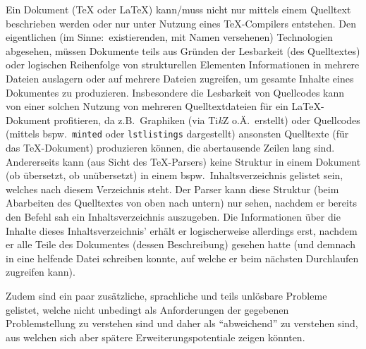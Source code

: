 \label{subsec:logicOutsideDocuments}%
Ein Dokument (\TeX{} oder \LaTeX{}) kann/muss nicht nur mittels einem Quelltext beschrieben werden oder nur unter Nutzung eines \TeX{}-Compilers entstehen. Den eigentlichen (im Sinne:\ existierenden, mit Namen versehenen) Technologien abgesehen, müssen Dokumente teils aus Gründen der Lesbarkeit (des Quelltextes) oder logischen Reihenfolge von strukturellen Elementen Informationen in mehrere Dateien auslagern oder auf mehrere Dateien zugreifen, um gesamte Inhalte eines Dokumentes zu produzieren. 
Insbesondere die Lesbarkeit von Quellcodes kann von einer solchen Nutzung von mehreren Quelltextdateien für ein \LaTeX{}-Dokument profitieren, da z.B.\ Graphiken (via Ti\textit{k}Z o.Ä.\ erstellt) oder Quellcodes (mittels bspw.\ \texttt{minted} oder \texttt{lstlistings} dargestellt) ansonsten Quelltexte (für das \TeX{}-Dokument) produzieren können, die abertausende Zeilen lang sind.
Andererseits kann (aus Sicht des \TeX{}-Parsers) keine Struktur in einem Dokument (ob übersetzt, ob unübersetzt) in einem bspw.\ Inhaltsverzeichnis gelistet sein, welches nach diesem Verzeichnis steht. Der Parser kann diese Struktur (beim Abarbeiten des Quelltextes von oben nach untern) nur sehen, nachdem er bereits den Befehl sah ein Inhaltsverzeichnis auszugeben. Die Informationen über die Inhalte dieses Inhaltsverzeichnis' erhält er logischerweise allerdings erst, nachdem er alle Teile des Dokumentes (dessen Beschreibung) gesehen hatte (und demnach in eine helfende Datei schreiben konnte, auf welche er beim nächsten Durchlaufen zugreifen kann).

Zudem sind ein paar zusätzliche, sprachliche und teils unlösbare Probleme gelistet, welche nicht unbedingt als Anforderungen der gegebenen Problemstellung zu verstehen sind und daher als \enquote{abweichend} zu verstehen sind, aus welchen sich aber spätere Erweiterungspotentiale zeigen könnten.

